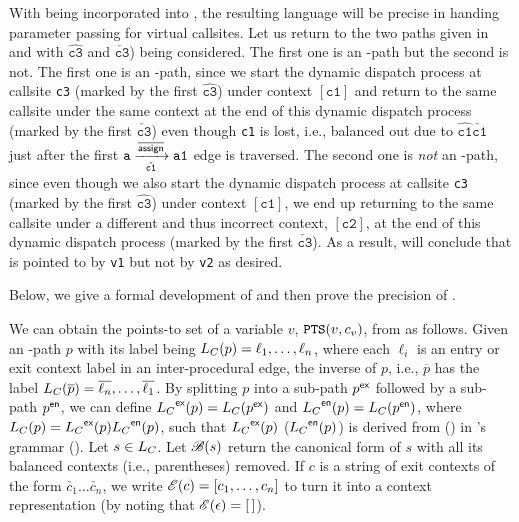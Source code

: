 With \LR being incorporated into
\LFC, the resulting language \capLFCR will be precise in handing parameter passing for virtual callsites. Let us return  to  the two paths given in  and
 with  $\hat{\boxed{\texttt{c3}}}$
and $\check{\boxed{\texttt{c3}}}$) being considered.
The first one is an \LFCR-path but the second is not. 
The first one is an  \LFCR-path, since we start the dynamic dispatch process
at callsite \texttt{c3} (marked by the first 
  $\hat{\boxed{\texttt{c3}}}$)
under context $[\texttt{c1}]$ and return to the same callsite under
the same context at the end of this dynamic dispatch process (marked by the first
  $\check{\boxed{\texttt{c3}}}$) even though \texttt{c1} is lost, i.e.,
  balanced out due to 
  $\hat{{\texttt{c1}}}\check{{\texttt{c1}}}$ just after the first
  $\mathtt{a}\xrightarrow[\check{{\mathtt{c1}}}]{\overline{\textsf{assign}}} \mathtt{a1}$ edge is
  traversed.
  The second one is \emph{not} an  \LFCR-path, since even though we also start the dynamic dispatch process
at callsite \texttt{c3} (marked by the first 
  $\hat{\boxed{\texttt{c3}}}$)
under context $[\texttt{c1}]$, we end up returning to the same callsite under
a different and thus incorrect context, $[ \texttt{c2}]$, at the end of this dynamic dispatch process (marked by the first
  $\check{\boxed{\texttt{c3}}}$).
As a result, \LFCR will conclude that
 is pointed to by \texttt{v1} but not by \texttt{v2} as desired.

Below, we give a formal development of \LR  and then
prove the precision of \LFCR.

We can obtain the points-to set of a variable $v$,  $\texttt{PTS}(v, c_v)$,
from \LFC as follows. 
Given an \LC-path $p$ with its label being
$\mbox{${L}_C$}(p)=\ell_1,\dots,\ell_n$, where each $\ell_i$ is an entry or exit
context label in an inter-procedural \assign edge,
 the inverse of $p$, i.e.,
$\overline{p}$ has the label
$\mbox{${L}_C$}(\overline{p})=\overline{\ell_n},\dots,
\overline{\ell_1}$.
By splitting $p$ into a sub-path $p^\textsf{ex}$ followed
by a sub-path $p^\textsf{en}$, we can define $\mbox{${L}_C$}^\textsf{ex}(p)=\mbox{${L}_C$}(p^\textsf{ex})$ 
and $\mbox{${L}_C$}^\textsf{en}(p)=\mbox{${L}_C$}(p^\textsf{en})$, where
$\mbox{${L}_C$}(p) = \mbox{${L}_C$}^\textsf{ex}(p)\mbox{${L}_C$}^\textsf{en}(p)$, such that  $\mbox{${L}_C$}^\textsf{ex}(p)$ ($\mbox{${L}_C$}^\textsf{en}(p)$) is
derived from 
\gramexit (\gramentry) in \LC's grammar ().
Let $s\in \mbox{${L}_C$}$.
Let $\mbox{$\mathscr{B}(s)$}$ return the canonical form of $s$ with
all its balanced contexts (i.e., parentheses) removed.
If $c$ is a string of exit contexts  of the form
$\check{c_1}
\dots\check{c_n}$, we write 
${\mathscr{E}}(c) = [c_1,\dots,c_n]$ to turn it into a context representation
(by noting that ${\mathscr{E}}(\epsilon)=[\,]$).



